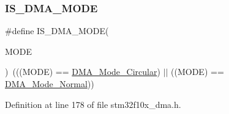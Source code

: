 \subsubsection{\texorpdfstring{I\+S\+\_\+\+D\+M\+A\+\_\+\+M\+O\+DE}{IS\_DMA\_MODE}}
{\footnotesize\ttfamily \#define I\+S\+\_\+\+D\+M\+A\+\_\+\+M\+O\+DE(\begin{DoxyParamCaption}\item[{}]{M\+O\+DE }\end{DoxyParamCaption})~(((M\+O\+DE) == \hyperlink{group___d_m_a__circular__normal__mode_ga36327b14c302098fbc5823ac3f1ae020}{D\+M\+A\+\_\+\+Mode\+\_\+\+Circular}) $\vert$$\vert$ ((M\+O\+DE) == \hyperlink{group___d_m_a__circular__normal__mode_ga36400f5b5095f1102ede4760d7a5959c}{D\+M\+A\+\_\+\+Mode\+\_\+\+Normal}))}



Definition at line 178 of file stm32f10x\+\_\+dma.\+h.

